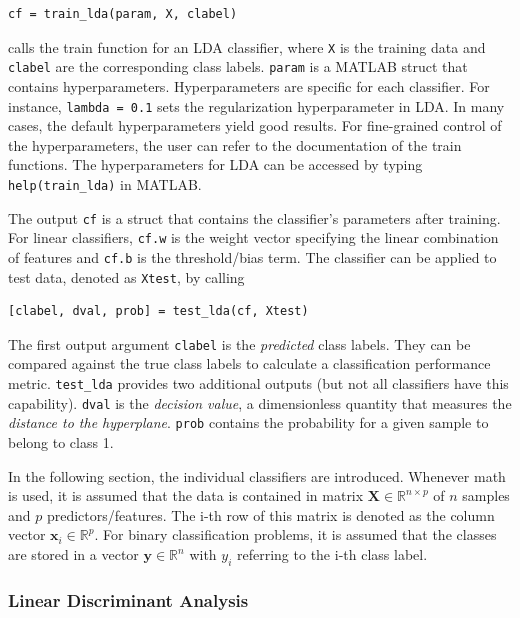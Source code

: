 \documentclass[utf8]{frontiersSCNS} %
\newcommand{\x}{\mathbf{x}}
\newcommand{\R}{\mathbb{R}}
\newcommand{\X}{\mathbf{X}}
\newcommand{\ttt}[1]{\texttt{#1}}
\begin{document}
\begin{verbatim}
cf = train_lda(param, X, clabel)
\end{verbatim}

calls the train function for an LDA classifier, where \ttt{X} is the training data and \ttt{clabel} are the corresponding class labels. \ttt{param} is a MATLAB struct that contains hyperparameters. Hyperparameters are specific for each classifier. For instance, \ttt{lambda = 0.1} sets the regularization hyperparameter in LDA. In many cases, the default hyperparameters yield good results. For fine-grained control of the hyperparameters, the user can refer to the documentation of the train functions. The hyperparameters for LDA can be accessed by typing \ttt{help(train\_lda)} in MATLAB. 

The output \ttt{cf} is a struct that contains the classifier's parameters after training. For linear classifiers, \ttt{cf.w} is the weight vector specifying the linear combination of features and \ttt{cf.b} is the threshold/bias term. The classifier can be applied to test data, denoted as \ttt{Xtest}, by calling

\begin{verbatim}
[clabel, dval, prob] = test_lda(cf, Xtest)
\end{verbatim}

The first output argument \ttt{clabel} is the \textit{predicted} class labels. They can be compared against the true class labels to calculate a classification performance metric. \ttt{test\_lda} provides two additional outputs (but not all classifiers have this capability). \ttt{dval} is the \textit{decision value}, a dimensionless quantity that measures the \textit{distance to the hyperplane}. \ttt{prob} contains the probability for a given sample to belong to class 1. 

In the following section, the individual classifiers are introduced. Whenever math is used, it is assumed that the data is contained in matrix $\X\in\R^{n \times p}$ of $n$ samples and $p$ predictors/features. The i-th row of this matrix is denoted as the column vector $\x_i\in\R^p$. For binary classification problems, it is assumed that the classes are stored in a vector $\mathbf{y}\in\R^n$ with $y_i$ referring to the i-th class label.

\subsubsection{Linear Discriminant Analysis}
\end{document}
